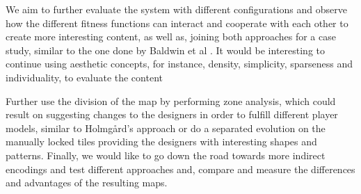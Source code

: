 
We aim to further evaluate the system with different configurations and observe how the different fitness functions can interact and cooperate with each other to create more interesting content, as well as, joining both approaches for a case study, similar to the one done by Baldwin et al \cite{p2Baldwin2017TowardsGeneration}. It would be interesting to continue using aesthetic concepts, for instance, density, simplicity, sparseness and individuality, to evaluate the content 

Further use the division of the map by performing zone analysis, which could result on suggesting changes to the designers in order to fulfill different player models, similar to Holmg\r{a}rd's approach \cite{p2Holmgard2014EvolvingModeling} or do a separated evolution on the manually locked tiles providing the designers with interesting shapes and patterns. Finally, we would like to go down the road towards more indirect encodings and test different approaches and, compare and measure the differences and advantages of the resulting maps.